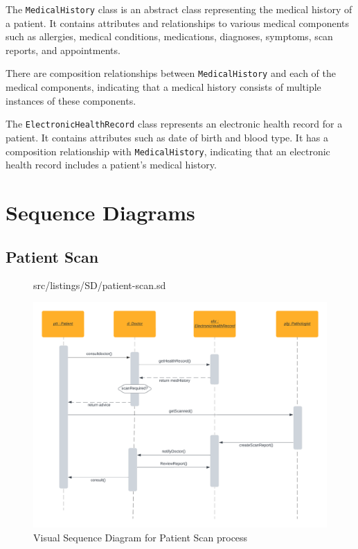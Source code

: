 The \texttt{MedicalHistory} class is an abstract class representing the medical history of a patient. It contains attributes and relationships to various medical components such as allergies, medical conditions, medications, diagnoses, symptoms, scan reports, and appointments.

There are composition relationships between \texttt{MedicalHistory} and each of the medical components, indicating that a medical history consists of multiple instances of these components.

The \texttt{ElectronicHealthRecord} class represents an electronic health record for a patient. It contains attributes such as date of birth and blood type. It has a composition relationship with \texttt{MedicalHistory}, indicating that an electronic health record includes a patient's medical history.


\section{Sequence Diagrams}


\subsection{Patient Scan}

\begin{figure}[]
\lstset{language=MontiArc}
 {src/listings/SD/patient-scan.sd}
\end{figure}

\begin{figure}[htb]
\begin{center}\includegraphics[width=12cm]{src/pic/SD1.png}\end{center}
\caption{Visual Sequence Diagram for Patient Scan process}
\label{SD1}
\end{figure}

